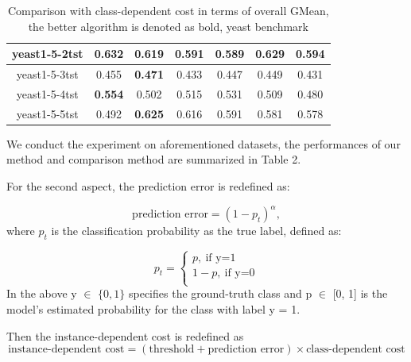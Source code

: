 \documentclass{article}
\begin{document}
\begin{table}[!ht]
\begin{tabular}{|c||c|ccccc|}
	yeast1-5-2tst             & \textbf{0.632}                        & \multicolumn{1}{c|}{0.619}          & \multicolumn{1}{c|}{0.591}          & \multicolumn{1}{c|}{0.589}      & \multicolumn{1}{c|}{0.629}      & 0.594          \\ \hline
	yeast1-5-3tst             & 0.455                                 & \multicolumn{1}{c|}{\textbf{0.471}} & \multicolumn{1}{c|}{0.433}          & \multicolumn{1}{c|}{0.447}      & \multicolumn{1}{c|}{0.449}      & 0.431          \\ \hline
	yeast1-5-4tst             & \textbf{0.554}                        & \multicolumn{1}{c|}{0.502}          & \multicolumn{1}{c|}{0.515}          & \multicolumn{1}{c|}{0.531}      & \multicolumn{1}{c|}{0.509}      & 0.480          \\ \hline
	yeast1-5-5tst             & 0.492                                 & \multicolumn{1}{c|}{\textbf{0.625}} & \multicolumn{1}{c|}{0.616}          & \multicolumn{1}{c|}{0.591}      & \multicolumn{1}{c|}{0.581}      & 0.578          \\ \hline
\end{tabular}
	\label{tab03:overall}
	\caption{Comparison with class-dependent cost in terms of overall GMean, the better algorithm is denoted as bold, yeast benchmark}
\end{table}

We conduct the experiment on aforementioned datasets, the performances of our method and comparison method are summarized in Table 2.


For the second aspect, the prediction error is redefined as: 

\begin{equation}
	\text{prediction error} = (1 - p_t)^\alpha,
\end{equation}
where $p_t$ is the classification probability as the true label, defined as:

\begin{equation}
	p_t = 
	\begin{cases}
		p, \ \text{if y=1}\\
		1-p, \ \text{if y=0}\\
	\end{cases}
\end{equation}
In the above y $\in$ $\{ 0, 1\}$ specifies the ground-truth class and p $\in$ [0, 1] is the model's estimated probability for the class with label y = 1.

Then the instance-dependent cost is redefined as 
\begin{equation}
	\text{instance-dependent cost}= (\text{threshold}+ \text{prediction error})\times \text{class-dependent cost}
\end{equation}
\end{document}
